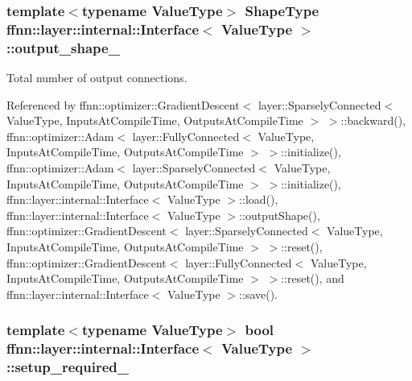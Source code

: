\hypertarget{classffnn_1_1layer_1_1internal_1_1_interface_aac8cae47508ba37964d11754e181813a}{
\subsubsection[{output\-\_\-shape\-\_\-}]{\setlength{\rightskip}{0pt plus 5cm}template$<$typename Value\-Type$>$ {\bf Shape\-Type} {\bf ffnn\-::layer\-::internal\-::\-Interface}$<$ Value\-Type $>$\-::output\-\_\-shape\-\_\-\hspace{0.3cm}{\ttfamily [protected]}}}\label{classffnn_1_1layer_1_1internal_1_1_interface_aac8cae47508ba37964d11754e181813a}


Total number of output connections. 



Referenced by ffnn\-::optimizer\-::\-Gradient\-Descent$<$ layer\-::\-Sparsely\-Connected$<$ Value\-Type, Inputs\-At\-Compile\-Time, Outputs\-At\-Compile\-Time $>$ $>$\-::backward(), ffnn\-::optimizer\-::\-Adam$<$ layer\-::\-Fully\-Connected$<$ Value\-Type, Inputs\-At\-Compile\-Time, Outputs\-At\-Compile\-Time $>$ $>$\-::initialize(), ffnn\-::optimizer\-::\-Adam$<$ layer\-::\-Sparsely\-Connected$<$ Value\-Type, Inputs\-At\-Compile\-Time, Outputs\-At\-Compile\-Time $>$ $>$\-::initialize(), ffnn\-::layer\-::internal\-::\-Interface$<$ Value\-Type $>$\-::load(), ffnn\-::layer\-::internal\-::\-Interface$<$ Value\-Type $>$\-::output\-Shape(), ffnn\-::optimizer\-::\-Gradient\-Descent$<$ layer\-::\-Sparsely\-Connected$<$ Value\-Type, Inputs\-At\-Compile\-Time, Outputs\-At\-Compile\-Time $>$ $>$\-::reset(), ffnn\-::optimizer\-::\-Gradient\-Descent$<$ layer\-::\-Fully\-Connected$<$ Value\-Type, Inputs\-At\-Compile\-Time, Outputs\-At\-Compile\-Time $>$ $>$\-::reset(), and ffnn\-::layer\-::internal\-::\-Interface$<$ Value\-Type $>$\-::save().

\hypertarget{classffnn_1_1layer_1_1internal_1_1_interface_a57f0de55599c9b6621a66096b5662ca8}{
\subsubsection[{setup\-\_\-required\-\_\-}]{\setlength{\rightskip}{0pt plus 5cm}template$<$typename Value\-Type$>$ bool {\bf ffnn\-::layer\-::internal\-::\-Interface}$<$ Value\-Type $>$\-::setup\-\_\-required\-\_\-\hspace{0.3cm}{\ttfamily [protected]}}}\label{classffnn_1_1layer_1_1internal_1_1_interface_a57f0de55599c9b6621a66096b5662ca8}


